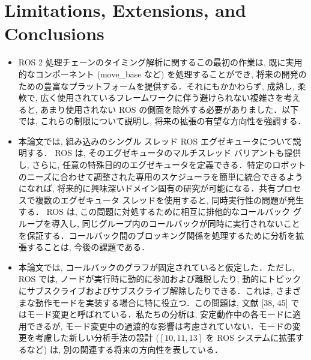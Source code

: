 
\section{Limitations, Extensions, and Conclusions}
\label{sec: limitations, extensions, and conclusions}

\begin{frame}{}
    \begin{itemize}
        \item ROS 2 処理チェーンのタイミング解析に関するこの最初の作業は, 既に実用的なコンポーネント (move\_base など) を処理することができ, 将来の開発のための豊富なプラットフォームを提供する．それにもかかわらず, 成熟し, 柔軟で, 広く使用されているフレームワークに伴う避けられない複雑さを考えると, あまり使用されない ROS の側面を除外する必要がありました．以下では, これらの制限について説明し, 将来の拡張の有望な方向性を強調する．
    \end{itemize}
\end{frame}

\begin{frame}{}
    \begin{itemize}
        \item 本論文では, 組み込みのシングル スレッド ROS エグゼキュータについて説明する． ROS は, そのエグゼキュータのマルチスレッド バリアントも提供し, さらに, 任意の特殊目的のエグゼキュータを定義できる．特定のロボットのニーズに合わせて調整された専用のスケジューラを簡単に統合できるようになれば, 将来的に興味深いドメイン固有の研究が可能になる．共有プロセスで複数のエグゼキュータ スレッドを使用すると, 同時実行性の問題が発生する． ROS は, この問題に対処するために相互に排他的なコールバック グループを導入し, 同じグループ内のコールバックが同時に実行されないことを保証する．コールバック間のブロッキング関係を処理するために分析を拡張することは, 今後の課題である．
    \end{itemize}
\end{frame}

\begin{frame}{}
    \begin{itemize}
        \item 本論文では, コールバックのグラフが固定されていると仮定した．ただし, ROS では, ノードが実行時に動的に参加および離脱したり, 動的にトピックにサブスクライブおよびサブスクライブ解除したりできる．これは, さまざまな動作モードを実装する場合に特に役立つ．この問題は, 文献 [38, 45] ではモード変更と呼ばれている．私たちの分析は, 安定動作中の各モードに適用できるが, モード変更中の過渡的な影響は考慮されていない．モードの変更を考慮した新しい分析手法の設計 ($[10,11,13]$ を ROS システムに拡張するなど) は, 別の関連する将来の方向性を表している．
    \end{itemize}
\end{frame}

